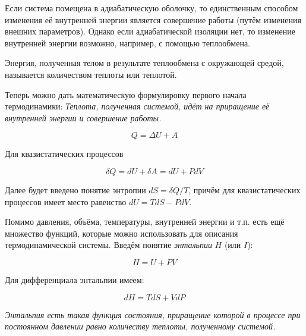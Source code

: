 Если система помещена в адиабатическую оболочку, то единственным способом изменения её внутренней энергии является совершение работы (путём изменения внешних параметров). Однако если адиабатической изоляции нет, то изменение внутренней энергии возможно, например, с помощью теплообмена.

\begin{definition}
    Энергия, полученная телом в результате теплообмена с окружающей средой, называется количеством теплоты или теплотой.
\end{definition}

Теперь можно дать математическую формулировку первого начала термодинамики: \textit{Теплота, полученная системой, идёт на приращение её внутренней энергии и совершение работы.}

\begin{equation}
    Q = \Delta U + A
\end{equation}

\noindent
Для квазистатических процессов

\begin{equation}
    \delta Q = dU + \delta A = dU + P dV
\end{equation}

Далее будет введено понятие энтропии $dS = \delta Q / T$, причём для квазистатических процессов имеет место равенство $dU = T dS - PdV$.

Помимо давления, объёма, температуры, внутренней энергии и т.п. есть ещё множество функций, которые можно использовать для описания термодинамической системы. Введём понятие \textit{энтальпии} $H$ (или $I$):

\begin{equation}
    H = U + PV
\end{equation}

\noindent
Для дифференциала энтальпии имеем:

\begin{equation}
    dH = T dS + V dP
\end{equation}

\textit{Энтальпия есть такая функция состояния, приращение которой в процессе при постоянном давлении равно количеству теплоты, полученному системой.}